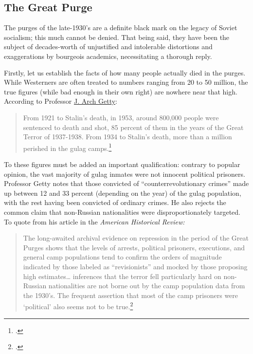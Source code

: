 \subsection*{The Great Purge}

The purges of the late-1930's are a definite black mark on the legacy of
Soviet socialism; this much cannot be denied. That being said, they have
been the subject of decades-worth of unjustified and intolerable
distortions and exaggerations by bourgeois academics, necessitating a
thorough reply.

Firstly, let us establish the facts of how many people actually died in
the purges. While Westerners are often treated to numbers ranging from
20 to 50 million, the true figures (while bad enough in their own right)
are nowhere near that high. According to Professor
\href{https://history.ucla.edu/faculty/j-arch-getty}{J. Arch Getty}:

\begin{quote}
From 1921 to Stalin's death, in 1953, around 800,000 people were
sentenced to death and shot, 85 percent of them in the years of the
Great Terror of 1937-1938. From 1934 to Stalin's death, more than a
  million perished in the gulag camps.\footcite{getty1993victims}
\end{quote}

To these figures must be added an important qualification: contrary to
popular opinion, the vast majority of gulag inmates were not innocent
political prisoners. Professor Getty notes that those convicted of
``counterrevolutionary crimes'' made up between 12 and 33 percent
(depending on the year) of the gulag population, with the rest having
been convicted of ordinary crimes. He also rejects the common claim that
non-Russian nationalities were disproportionately targeted. To quote
from his article in the \emph{American Historical Review:}

\begin{quote}
The long-awaited archival evidence on repression in the period of the
Great Purges shows that the levels of arrests, political prisoners,
executions, and general camp populations tend to confirm the orders of
magnitude indicated by those labeled as ``revisionists'' and mocked by
those proposing high estimates\ldots{} inferences that the terror fell
particularly hard on non-Russian nationalities are not borne out by the
camp population data from the 1930's. The frequent assertion that most
  of the camp prisoners were `political' also seems not to be true.\footcite{getty1993victims}
\end{quote}

